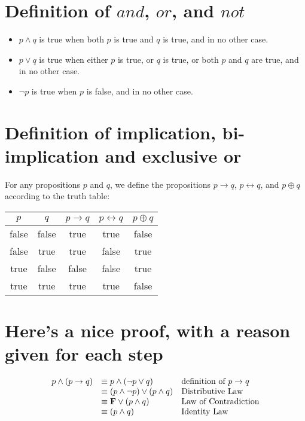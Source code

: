 \documentclass[letterpaper]{article}
\begin{document}
	\section {\bf Definition of $and$, $or$, and $not$}
		\begin{itemize}
          \item $p \wedge q$ is true when both $p$ is true and $q$ is true, and in no other case.
          \item $p \vee q$ is true when either $p$ is true, or $q$ is true, or both $p$ and $q$ are true, and in no other case.
          \item $\neg p$ is true when $p$ is false, and in no other case.
		\end{itemize}
    \section{\bf Definition of implication, bi-implication and exclusive or}
    	For any propositions $p$ and $q$, we define the propositions $p \rightarrow q$, $p \leftrightarrow q$, and $p \oplus q$ according to the truth table:
    	\begin{center}
        	\begin{tabular}{|c|c||c|c|c|}
            	\hline
                	$p$ & $q$ & $p \rightarrow q$ & $p \leftrightarrow q$ & $p \oplus q$\\
                \hline
                	false & false & true & true & false \\
                \hline
                	false & true & true & false & true \\
                \hline
                	true & false & false & false & true \\
                \hline
                	true & true & true & true & false \\
                \hline
       		\end{tabular}
    	\end{center}
    \section{\bf Here's a nice proof, with a reason given for each step}
    	\begin{displaymath}
    		\begin{array}{lll}
    			p \wedge (p\rightarrow q) & \equiv p \wedge (\neg p \vee q) &  $definition of $p \rightarrow q \\
    			& \equiv (p \wedge \neg p) \vee (p \wedge q) & $Distributive Law$ \\
    			& \equiv {\bf F} \vee (p \wedge q) & $Law of Contradiction$ \\
    			& \equiv (p \wedge q) & $Identity Law$ \\
    		\end{array}
    	\end{displaymath}
\end{document}
